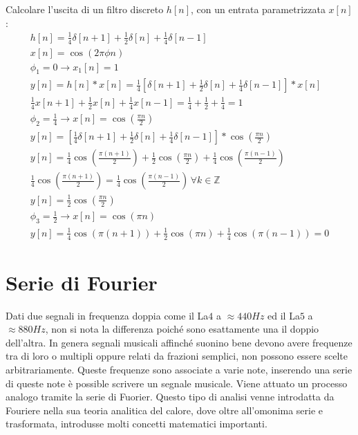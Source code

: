 \documentclass{article}
\numberwithin{equation}{subsection}
\begin{document}
Calcolare l'uscita di un filtro discreto $h[n]$, con un entrata parametrizzata $x[n]$:
\begin{gather*}
    h[n]=\displaystyle\frac{1}{4}\delta[n+1]+\frac{1}{2}\delta[n]+\frac{1}{4}\delta[n-1]\\
    x[n]=\cos(2\pi\phi n)\\
    \phi_1=0\to x_1[n]=1\\
    y[n]=h[n]*x[n]=\displaystyle\frac{1}{4}\left[\delta[n+1]+\frac{1}{2}\delta[n]+\frac{1}{4}\delta[n-1]\right]*x[n]\\
    \displaystyle\frac{1}{4}x[n+1]+\frac{1}{2}x[n]+\frac{1}{4}x[n-1]=\frac{1}{4}+\frac{1}{2}+\frac{1}{4}=1\\
    \phi_2=\displaystyle\frac{1}{4}\to x[n]=\cos\left(\displaystyle\frac{\pi n}{2}\right)\\
    y[n]=\left[\displaystyle\frac{1}{4}\delta[n+1]+\frac{1}{2}\delta[n]+\frac{1}{4}\delta[n-1]\right]*\cos\left(\frac{\pi n}{2}\right)\\
    y[n]=\displaystyle\frac{1}{4}\cos\left(\frac{\pi (n+1)}{2}\right)+\frac{1}{2}\cos\left(\frac{\pi n}{2}\right)+\frac{1}{4}\cos\left(\frac{\pi (n-1)}{2}\right)\\
    \displaystyle\frac{1}{4}\cos\left(\frac{\pi (n+1)}{2}\right)=\frac{1}{4}\cos\left(\frac{\pi (n-1)}{2}\right)\,\forall k\in\mathbb{Z}\\
    y[n]=\displaystyle\frac{1}{2}\cos\left(\frac{\pi n}{2}\right)\\
    \phi_3=\displaystyle\frac{1}{2}\to x[n]=\cos\left(\displaystyle{\pi n}\right)\\
    y[n]=\displaystyle\frac{1}{4}\cos(\pi (n+1))+\frac{1}{2}\cos(\pi n)+\frac{1}{4}\cos(\pi(n-1))=0
\end{gather*}

\clearpage

\section{Serie di Fourier}

Dati due segnali in frequenza doppia come il La$4$ a $\approx 440Hz$ ed il La$5$ a $\approx 880Hz$, non si nota la differenza poiché sono esattamente una il doppio dell'altra. 
In genera segnali musicali affinché suonino bene devono avere frequenze tra di loro o multipli oppure relati da frazioni semplici, non possono essere scelte arbitrariamente. 
Queste frequenze sono associate a varie note, inserendo una serie di queste note è possible scrivere un segnale musicale. Viene attuato un processo analogo tramite la serie di 
Fuorier. Questo tipo di analisi venne introdatta da Fouriere nella sua teoria analitica del calore, dove oltre all'omonima serie e trasformata, introdusse molti concetti 
matematici importanti. 
\end{document}
